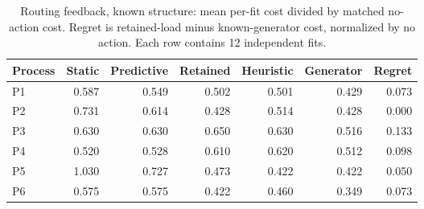 \begin{table}[t]\caption{Routing feedback, known structure: mean per-fit cost divided by matched no-action cost. Regret is retained-load minus known-generator cost, normalized by no action. Each row contains 12 independent fits.}\label{tab:structures_results}\centering\small\setlength{\tabcolsep}{4pt}
\begin{tabular}{lrrrrrr}\toprule
Process & Static & Predictive & Retained & Heuristic & Generator & Regret\\\midrule
P1 & 0.587 & 0.549 & 0.502 & 0.501 & 0.429 & 0.073 \\
P2 & 0.731 & 0.614 & 0.428 & 0.514 & 0.428 & 0.000 \\
P3 & 0.630 & 0.630 & 0.650 & 0.630 & 0.516 & 0.133 \\
P4 & 0.520 & 0.528 & 0.610 & 0.620 & 0.512 & 0.098 \\
P5 & 1.030 & 0.727 & 0.473 & 0.422 & 0.422 & 0.050 \\
P6 & 0.575 & 0.575 & 0.422 & 0.460 & 0.349 & 0.073 \\
\bottomrule\end{tabular}\end{table}
